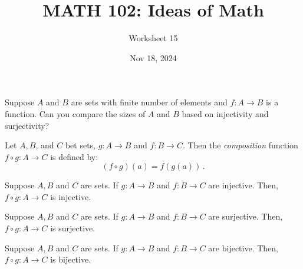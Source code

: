 \documentclass[12pt]{amsart}
\title{ MATH 102: Ideas  of Math }
\author{ Worksheet 15 }
\date{Nov 18, 2024}
\begin{document}
\maketitle

\begin{problem}
Suppose $A$ and $B$ are sets with finite number of elements
and $f:A\to B$ is a function.
Can you compare the sizes of $A$ and $B$ based on
injectivity and surjectivity?
\end{problem}

\vspace{7cm}


\begin{definition}
	Let $A,B$, and $C$ bet sets, $g: A\to B$ and $f:B\to C$.
	Then the \emph{composition} function $f\circ g:A\to C$ is defined
	by:
	\begin{equation*}
		(f \circ g) (a) = f(g(a)) \,.
	\end{equation*}
\end{definition}


\begin{theorem}
	Suppose $A,B$ and $C$ are sets.
	If $g:A\to B$ and $f:B\to C$ are injective.
	Then,
	$f\circ g: A\to C$ is injective.
\end{theorem}

\vspace{7cm}

\begin{theorem}
	Suppose $A,B$ and $C$ are sets.
	If $g:A\to B$ and $f:B\to C$ are surjective.
	Then,
	$f\circ g: A\to C$ is surjective.
\end{theorem}

\vspace{7cm}

\begin{theorem}
	Suppose $A,B$ and $C$ are sets.
	If $g:A\to B$ and $f:B\to C$ are bijective.
	Then,
	$f\circ g: A\to C$ is bijective.
\end{theorem}

\vspace{7cm}
\end{document}
